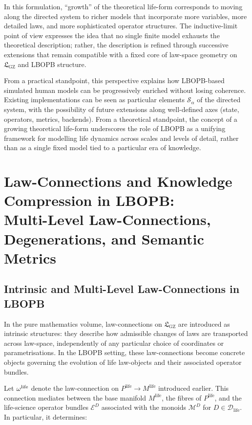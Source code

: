 \documentclass[11pt]{book}
\theoremstyle{plain}
\theoremstyle{definition}
\theoremstyle{remark}
\newcommand{\GZLS}{\ensuremath{\mathfrak{L}_{\mathrm{GZ}}}}       \newcommand{\GZLT}{\ensuremath{M_{!w}}}                           \newcommand{\GZLOC}{\ensuremath{A_M}}                             \newcommand{\GZLCurv}{\ensuremath{\mathcal{F}_{\mathrm{law}}}}
\begin{document}
In this formulation, ``growth'' of the theoretical life-form corresponds
to moving along the directed system to richer models that incorporate
more variables, more detailed laws, and more sophisticated operator
structures. The inductive-limit point of view expresses the idea that
no single finite model exhausts the theoretical description; rather,
the description is refined through successive extensions that remain
compatible with a fixed core of law-space geometry on $\GZLS$ and
LBOPB structure.

From a practical standpoint, this perspective explains how LBOPB-based
simulated human models can be progressively enriched without losing
coherence. Existing implementations can be seen as particular elements
$\mathcal{S}_{\alpha}$ of the directed system, with the possibility of
future extensions along well-defined axes (state, operators, metrics,
backends). From a theoretical standpoint, the concept of a growing
theoretical life-form underscores the role of LBOPB as a unifying
framework for modelling life dynamics across scales and levels of
detail, rather than as a single fixed model tied to a particular era of
knowledge.

\chapter[Law-Connections and Knowledge Compression in LBOPB]{Law-Connections and Knowledge Compression in LBOPB:\\
         Multi-Level Law-Connections, Degenerations, and Semantic Metrics}


\section{Intrinsic and Multi-Level Law-Connections in LBOPB}


In the pure mathematics volume, law-connections on $\GZLS$ are
introduced as intrinsic structures: they describe how admissible
changes of laws are transported across law-space, independently of any
particular choice of coordinates or parametrisations. In the LBOPB
setting, these law-connections become concrete objects governing the
evolution of life law-objects and their associated operator bundles.

Let $\omega^{\mathrm{life}}$ denote the law-connection on
$P^{\mathrm{life}} \to M^{\mathrm{life}}$ introduced earlier. This
connection mediates between the base manifold $M^{\mathrm{life}}$,
the fibres of $P^{\mathrm{life}}$, and the life-science operator
bundles $\mathcal{E}^{D}$ associated with the monoids
$\mathcal{M}^{D}$ for $D \in \mathcal{D}_{\mathrm{life}}$. In
particular, it determines:
\end{document}
